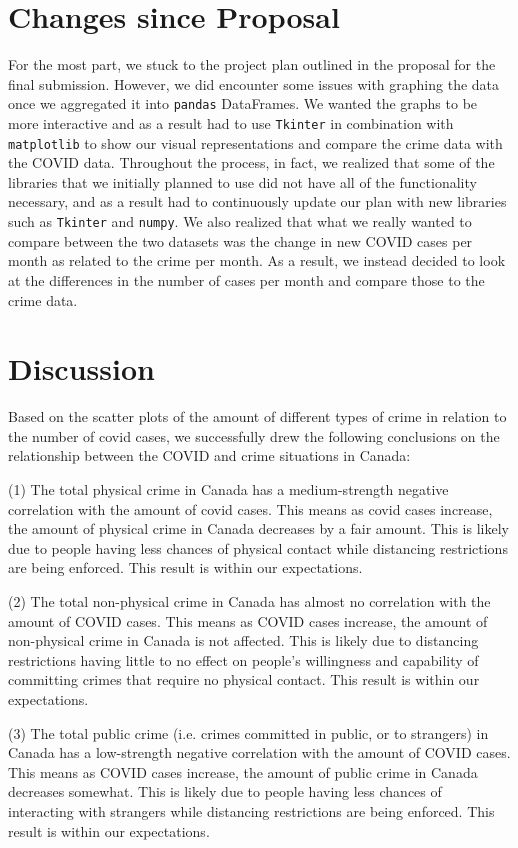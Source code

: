 \documentclass[fontsize=11pt]{article}
\begin{document}
\section{Changes since Proposal}
For the most part, we stuck to the project plan outlined in the proposal for the final submission. However, we did encounter some issues with graphing the data once we aggregated it into \verb+pandas+ DataFrames. We wanted the graphs to be more interactive and as a result had to use \verb+Tkinter+ in combination with \verb+matplotlib+ to show our visual representations and compare the crime data with the COVID data. Throughout the process, in fact, we realized that some of the libraries that we initially planned to use did not have all of the functionality necessary, and as a result had to continuously update our plan with new libraries such as \verb+Tkinter+ and \verb+numpy+. We also realized that what we really wanted to compare between the two datasets was the change in new COVID cases per month as related to the crime per month. As a result, we instead decided to look at the differences in the number of cases per month and compare those to the crime data.

\section{Discussion}
Based on the scatter plots of the amount of different types of crime in relation to the number of covid cases, we successfully drew the following conclusions on the relationship between the COVID and crime situations in Canada:

(1) The total physical crime in Canada has a medium-strength negative correlation with the amount of covid cases. This means as covid cases increase, the amount of physical crime in Canada decreases by a fair amount. This is likely due to people having less chances of physical contact while distancing restrictions are being enforced. This result is within our expectations.

(2) The total non-physical crime in Canada has almost no correlation with the amount of COVID cases. This means as COVID cases increase, the amount of non-physical crime in Canada is not affected. This is likely due to distancing restrictions having little to no effect on people's willingness and capability of committing crimes that require no physical contact. This result is within our expectations.

(3) The total public crime (i.e. crimes committed in public, or to strangers) in Canada has a low-strength negative correlation with the amount of COVID cases. This means as COVID cases increase, the amount of public crime in Canada decreases somewhat. This is likely due to people having less chances of interacting with strangers while distancing restrictions are being enforced. This result is within our expectations.
\end{document}

